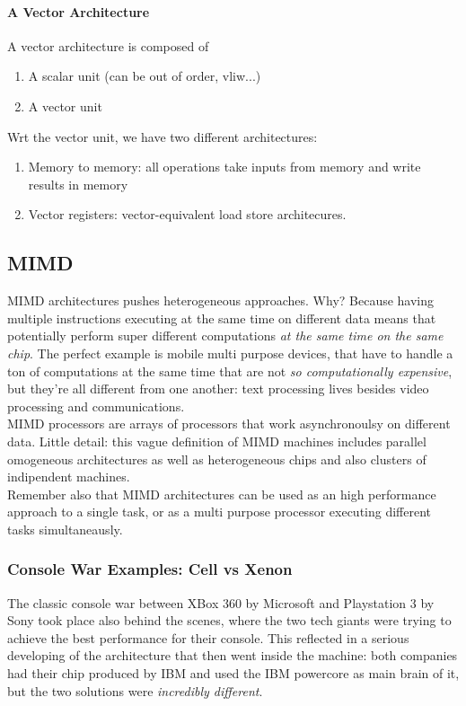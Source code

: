 \documentclass[10pt,a4paper]{article}
\begin{document}
				\paragraph{A Vector Architecture}
					A vector architecture is composed of
					\begin{enumerate}
						\item A scalar unit (can be out of order, vliw...)
						\item A vector unit
					\end{enumerate}
					Wrt the vector unit, we have two different architectures:
					\begin{enumerate}
						\item Memory to memory: all operations take inputs from memory and write results in memory
						\item Vector registers: vector-equivalent load store architecures.
					\end{enumerate}
					
			\subsection{MIMD}
				MIMD architectures pushes heterogeneous approaches. Why? Because having multiple instructions executing at the same time on different data means that potentially perform super different computations \emph{at the same time on the same chip}. The perfect example is mobile multi purpose devices, that have to handle a ton of computations at the same time that are not \emph{so computationally expensive}, but they're all different from one another: text processing lives besides video processing and communications.\\
				MIMD processors are arrays of processors that work asynchronoulsy on different data. Little detail: this vague definition of MIMD machines includes parallel omogeneous architectures as well as heterogeneous chips and also clusters of indipendent machines.\\
				Remember also that MIMD architectures can be used as an high performance approach to a single task, or as a multi purpose processor executing different tasks simultaneausly. 
				
				\subsubsection{Console War Examples: Cell vs Xenon}
					The classic console war between XBox 360 by Microsoft and Playstation 3 by Sony took place also behind the scenes, where the two tech giants were trying to achieve the best performance for their console. This reflected in a serious developing of the architecture that then went inside the machine: both companies had their chip produced by IBM and used the IBM powercore as main brain of it, but the two solutions were \emph{incredibly different}.
					
\end{document}
